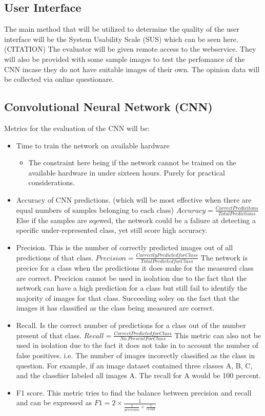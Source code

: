   \subsection{User Interface}
  The main method that will be utilized to determine the quality of the user interface will be the System Usability Scale (SUS) which can be seen here. (CITATION) %
  The evaluator will be given remote access to the webservice. They will also be provided with some sample images to test the perfomance of the CNN incase they do not have suitable images of their own.
  The opinion data will be collected via online questionare.
  \subsection{Convolutional Neural Network (CNN)}
  Metrics for the evaluation of the CNN will be:
  \begin{itemize}
    \item Time to train the network on available hardware
    \begin{itemize}
      \item The constraint here being if the network cannot be trained on the available hardware in under sixteen hours. Purely for practical considerations.
    \end{itemize}
    \item Accuracy of CNN predictions. (which will be most effective when there are equal numbers of samples belonging to each class) $Accuracy = \frac{Correct Predicitons}{Total Predictions}$ Else if the samples are sqewed, the network could be a faliure at detecting a specific under-represented class, yet still score high accuracy.
    \item Precision. This is the number of correctly predicted images out of all predictions of that class. $Precision = \frac{Correctly Predicted for Class}{Total Predicted for Class}$ The network is precice for a class when the predictions it does make for the measured class are correct. Precicion cannot be used in isolation due to the fact that the network can have a high prediction for a class but still fail to identify the majority of images for that class. Succeeding soley on the fact that the images it has classified as the class being measured are correct.
    \item Recall. Is the correct number of predictions for a class out of the number present of that class. $Recall = \frac{Correct Predicted for Class}{No. Present For Class}$
    This metric can also not be used in isolation due to the fact it does not take in to account the number of false positives. i.e. The number of images incorectly classified as the class in question. For example, if an image dataset contained three classes A, B, C, and the classfiier labeled all images A. The recall for A would be 100 percent.
    \item F1 score. This metric tries to find the balance between precision and recall and can be expressed as $F1 = 2 \times \frac{1}{\frac{1}{precicion} + \frac{1}{recall}}$
  \end{itemize}
